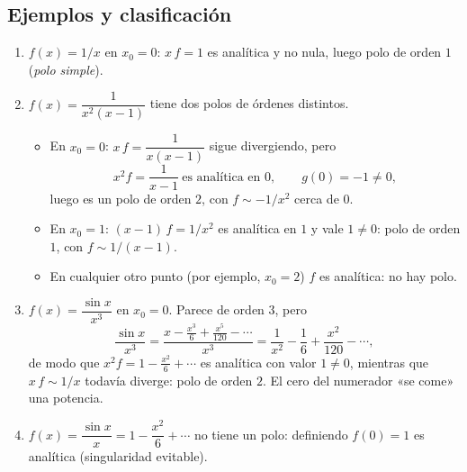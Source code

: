 \subsection{Ejemplos y clasificación}\label{sec:ejemplos-polos}

\begin{ejemplo}\label{ej:polos}
\leavevmode
\begin{enumerate}[label=(\roman*)]
  \item $f(x)=1/x$ en $x_0=0$: $x\,f=1$ es analítica y no nula, luego polo
        de orden $1$ (\emph{polo simple}).
  \item $f(x)=\dfrac{1}{x^{2}(x-1)}$ tiene dos polos de órdenes distintos.
        \begin{itemize}
          \item En $x_0=0$: $x\,f=\dfrac1{x(x-1)}$ sigue divergiendo, pero
                \begin{equation}\label{eq:ej-doble}
                  x^{2}f=\frac{1}{x-1}\ \text{es analítica en }0,\qquad g(0)=-1\neq0,
                \end{equation}
                luego es un polo de orden $2$, con $f\sim-1/x^{2}$ cerca de $0$.
          \item En $x_0=1$: $(x-1)\,f=1/x^{2}$ es analítica en $1$ y vale
                $1\neq0$: polo de orden $1$, con $f\sim1/(x-1)$.
          \item En cualquier otro punto (por ejemplo, $x_0=2$) $f$ es
                analítica: no hay polo.
        \end{itemize}
  \item $f(x)=\dfrac{\sin x}{x^{3}}$ en $x_0=0$. Parece de orden $3$, pero
        \begin{equation}\label{eq:sen-x3}
          \frac{\sin x}{x^{3}}=\frac{x-\frac{x^{3}}{6}+\frac{x^{5}}{120}-\cdots}{x^{3}}
          =\frac1{x^{2}}-\frac16+\frac{x^{2}}{120}-\cdots ,
        \end{equation}
        de modo que $x^{2}f=1-\tfrac{x^{2}}{6}+\cdots$ es analítica con valor
        $1\neq0$, mientras que $x\,f\sim1/x$ todavía diverge: polo de orden
        $2$. El cero del numerador «se come» una potencia.
  \item $f(x)=\dfrac{\sin x}{x}=1-\dfrac{x^{2}}{6}+\cdots$ no tiene un polo:
        definiendo $f(0)=1$ es analítica (singularidad evitable).
\end{enumerate}
\end{ejemplo}

